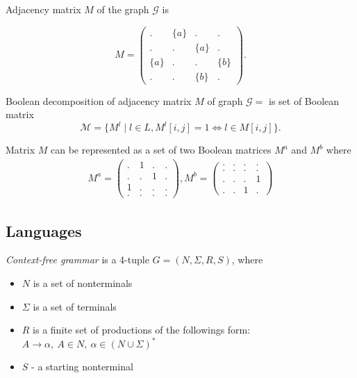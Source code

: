 Adjacency matrix $M$ of the graph $\mathcal{G}$ is

$$
    M =
    \begin{pmatrix}
    . & \{a\} & . & .     \\
    . & . & \{a\} & .     \\
    \{a\} & . & . & \{b\} \\
    . & . & \{b\} & .
    \end{pmatrix}.
$$

\begin{definition}

Boolean decomposition of adjacency matrix $M$ of graph $\mathcal{G}=$ is set of Boolean matrix $$\mathcal{M} = \{M^l \mid l \in L, M^l[i,j]=1 \iff l \in M[i,j]\}.$$

\end{definition}

Matrix $M$ can be represented as a set of two Boolean matrices $M^a$ and $M^b$ where
\begin{align}
M^{a} =
\begin{pmatrix}
    . & 1 & . & .   \\
    . & . & 1 & .   \\
    1 & . & . & .   \\
    . & . & . & .  
\end{pmatrix}, 
M^{b} =
\begin{pmatrix}      
    . & . & . & .   \\
    . & . & . & .   \\
    . & . & . & 1   \\
    . & . & 1 & . 
\end{pmatrix} \label{eq:boolean_decomposition_of_graph}
\end{align}
\subsection{Languages}

\begin{definition}\emph{Context-free grammar} is a 4-tuple $G=(N, \Sigma, R, S)$, where 
\begin{itemize}
    \item $N$ is a set of nonterminals
    \item $\Sigma$ is a set of terminals
    \item $R$ is a finite set of productions of the followings form: $A \to \alpha, ~A \in N,~ \alpha \in (N \cup \Sigma)^*$
    \item $S$ - a starting nonterminal
\end{itemize}
\end{definition}

